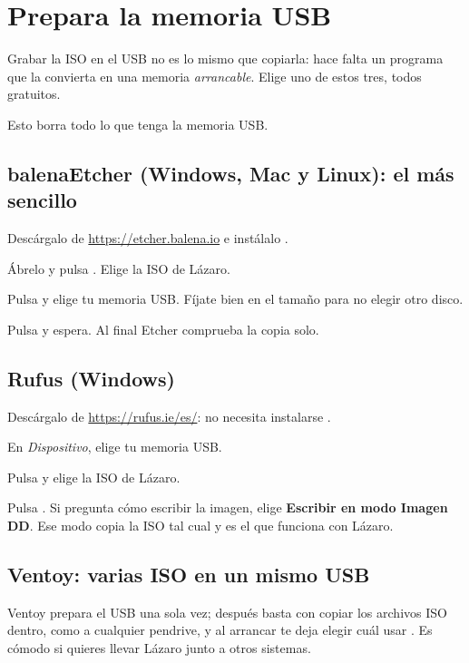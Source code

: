 \section{Prepara la memoria USB}\label{sec:usb}

Grabar la ISO en el USB no es lo mismo que copiarla: hace falta un programa
que la convierta en una memoria \emph{arrancable}. Elige uno de estos tres,
todos gratuitos.

\begin{cuidado}
Esto borra todo lo que tenga la memoria USB.
\end{cuidado}

\subsection{balenaEtcher (Windows, Mac y Linux): el más sencillo}
\begin{pasos}
  \item Descárgalo de \url{https://etcher.balena.io} e instálalo
        \cite{etcher}.
  \item Ábrelo y pulsa . Elige la ISO de Lázaro.
  \item Pulsa  y elige tu memoria USB. Fíjate bien en
        el tamaño para no elegir otro disco.
  \item Pulsa  y espera. Al final Etcher comprueba la copia
        solo.
\end{pasos}

\subsection{Rufus (Windows)}
\begin{pasos}
  \item Descárgalo de \url{https://rufus.ie/es/}: no necesita instalarse
        \cite{rufus}.
  \item En \emph{Dispositivo}, elige tu memoria USB.
  \item Pulsa  y elige la ISO de Lázaro.
  \item Pulsa . Si pregunta cómo escribir la imagen, elige
        \textbf{Escribir en modo Imagen DD}. Ese modo copia la ISO tal cual
        y es el que funciona con Lázaro.
\end{pasos}

\subsection{Ventoy: varias ISO en un mismo USB}
Ventoy prepara el USB una sola vez; después basta con copiar los archivos
ISO dentro, como a cualquier pendrive, y al arrancar te deja elegir cuál
usar \cite{ventoy}. Es cómodo si quieres llevar Lázaro junto a otros
sistemas.

